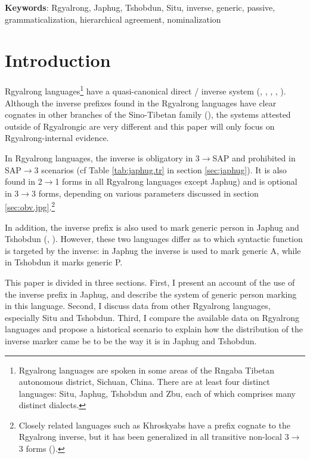 \textbf{Keywords}: Rgyalrong, Japhug, Tshobdun, Situ, inverse, generic, passive, grammaticalization, hierarchical agreement, nominalization

 
\section{Introduction}
Rgyalrong languages\footnote{Rgyalrong languages are spoken in some areas of the Rngaba Tibetan autonomous district, Sichuan, China. There are at least four distinct languages: Situ, Japhug, Tshobdun and Zbu, each of which comprises many distinct dialects.} have a quasi-canonical direct / inverse system (\citealt{delancey81direction}, \citealt{jackson02rentongdengdi}, \citealt{jacques10inverse}, \citealt{gongxun14agreement}, \citealt{jacques14inverse}). Although the inverse prefixes found in the Rgyalrong languages have  clear cognates  in other branches of the Sino-Tibetan family (\citealt{delancey10agreement}), the systems attested outside of Rgyalrongic are very different and this paper will only focus on Rgyalrong-internal evidence.

In Rgyalrong languages, the inverse is obligatory in 3$\rightarrow$SAP and prohibited in SAP$\rightarrow$3 scenarios (cf Table \ref{tab:japhug.tr} in section \ref{sec:japhug}). It is also found in  2$\rightarrow$1 forms in all Rgyalrong languages except Japhug) and is optional in 3$\rightarrow$3 forms, depending on various parameters discussed  in section \ref{sec:obv.jpg}.\footnote{Closely related languages such as Khroskyabs have a prefix cognate to the Rgyalrong inverse, but it has been generalized in all transitive non-local 3$\rightarrow$3 forms (\citealt{lai13affixale}).}

In addition, the inverse prefix is also used to mark generic person in Japhug and Tshobdun  (\citealt{jacques12demotion}, \citealt{sun14generic}). However, these two languages differ as to which syntactic function is targeted by the inverse: in Japhug the inverse is used to mark generic A, while in Tshobdun it marks generic P. 

  This paper is divided in three sections. First, I present an account of the use of the inverse prefix in Japhug, and describe the system of generic person marking in this language. Second, I  discuss data from other Rgyalrong languages, especially Situ and Tshobdun. Third, I compare the available data on Rgyalrong languages and propose   a historical scenario to explain how the distribution of the inverse marker came be to be the way it is in Japhug and Tshobdun.
 
